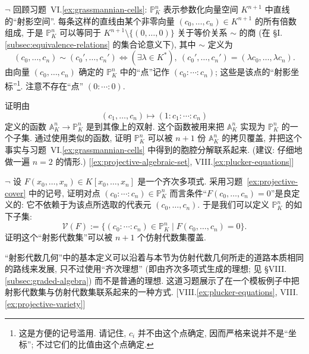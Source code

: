 \begin{prob}\label{ex:projective-cover}
$\neg$ 回顾习题~VI.\ref{ex:grassmannian-cells}: $\mathbb{P}_K^n$ 表示参数化向量空间 $K^{n+1}$ 中直线的``射影空间''. 每条这样的直线由某个非零向量 $(c_0,\ldots ,c_n)\in K^{n+1}$ 的所有倍数组成, 于是 $\mathbb{P}_K^n$ 可以等同于 $K^{n+1}\setminus\{(0,\ldots ,0)\}$ 关于等价关系 $\sim$ 的商 (在 §I.\ref{subsec:equivalence-relations} 的集合论意义下), 其中 $\sim$ 定义为
\[
(c_0,\ldots ,c_n)\sim (c_0',\ldots ,c_n')\iff (\exists \lambda\in K^{*}),\ (c_0',\ldots ,c_n')=(\lambda c_0,\ldots ,\lambda c_n).
\]
由向量 $(c_0,\ldots ,c_n)$ 确定的 $\mathbb{P}_K^n$ 中的``点''记作 $(c_0:\cdots :c_n)$; 这些是该点的``射影坐标''\footnote{这是方便的记号滥用. 请记住, $c_i$ 并不由这个点确定, 因而严格来说并不是``坐标''; 不过它们的比值由这个点确定.}. 注意不存在``点'' $(0:\cdots :0)$.

证明由
\[
(c_1,\ldots ,c_n)\mapsto (1:c_1:\cdots :c_n)
\]
定义的函数 $\mathbb{A}_K^n\to\mathbb{P}_K^n$ 是到其像上的双射. 这个函数被用来把 $\mathbb{A}_K^n$ 实现为 $\mathbb{P}_K^n$ 的一个子集. 通过使用类似的函数, 证明 $\mathbb{P}_K^n$ 可以被 $n+1$ 份 $\mathbb{A}_K^n$ 的拷贝覆盖, 并把这个事实与习题~VI.\ref{ex:grassmannian-cells} 中得到的胞腔分解联系起来. (建议: 仔细地做一遍 $n=2$ 的情形.) [\ref{ex:projective-algebraic-set}, VIII.\ref{ex:plucker-equations}]
\end{prob}

\begin{prob}\label{ex:projective-algebraic-set}
$\neg$ 设 $F(x_0,\ldots ,x_n)\in K[x_0,\ldots ,x_n]$ 是一个齐次多项式. 采用习题~\ref{ex:projective-cover} 中的记号, 证明对点 $(c_0:\cdots :c_n)\in\mathbb{P}_K^n$ 而言条件``$F(c_0,\ldots ,c_n)=0$''是良定义的: 它不依赖于为该点所选取的代表元 $(c_0,\ldots ,c_n)$. 于是我们可以定义 $\mathbb{P}_K^n$ 的如下子集:
\[
\mathcal{V}(F):=\{(c_0:\cdots :c_n)\in\mathbb{P}_K^n\mid F(c_0,\ldots ,c_n)=0\}.
\]
证明这个``射影代数集''可以被 $n+1$ 个仿射代数集覆盖.

``射影代数几何''中的基本定义可以沿着与本节为仿射代数几何所走的道路本质相同的路线来发展, 只不过使用``齐次理想'' (即由齐次多项式生成的理想; 见 §VIII.\ref{subsec:graded-algebra}) 而不是普通的理想. 这道习题展示了在一个模板例子中把射影代数集与仿射代数集联系起来的一种方式. [VIII.\ref{ex:plucker-equations}, VIII.\ref{ex:projective-variety}]
\end{prob}

